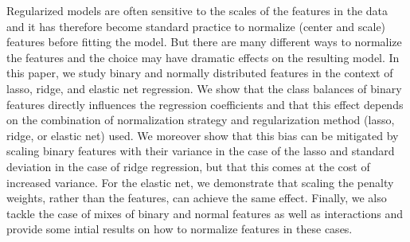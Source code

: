 Regularized models are often sensitive to the scales of the features in the data and it has
therefore become standard practice to normalize (center and scale) features before fitting
the model. But there are many different ways to normalize the features and the choice may
have dramatic effects on the resulting model. In this paper, we study binary and normally
distributed features in the context of lasso, ridge, and elastic net regression. We show
that the class balances of binary features directly influences the regression coefficients
and that this effect depends on the combination of normalization strategy and
regularization method (lasso, ridge, or elastic net) used. We moreover show that this bias
can be mitigated by scaling binary features with their variance in the case of the lasso
and standard deviation in the case of ridge regression, but that this comes at the cost of
increased variance. For the elastic net, we demonstrate that scaling the penalty weights,
rather than the features, can achieve the same effect. Finally, we also tackle the case of
mixes of binary and normal features as well as interactions and provide some intial results
on how to normalize features in these cases.
